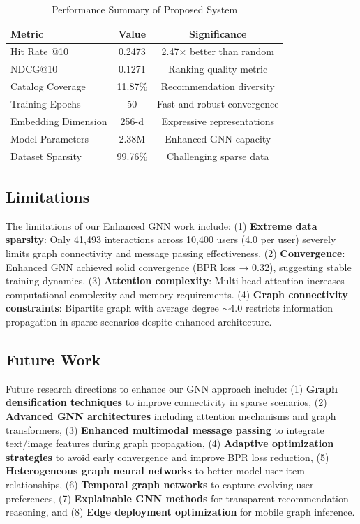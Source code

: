 \documentclass[journal]{IEEEtran} %
\begin{document}
\begin{table}[htbp]
\centering
\caption{Performance Summary of Proposed System}
\label{tab:performance_summary}
\begin{tabular}{lcc}
\toprule
\textbf{Metric} & \textbf{Value} & \textbf{Significance} \\
\midrule
Hit Rate @10 & 0.2473 & 2.47× better than random \\
NDCG@10 & 0.1271 & Ranking quality metric \\
Catalog Coverage & 11.87\% & Recommendation diversity \\
Training Epochs & 50 & Fast and robust convergence \\
Embedding Dimension & 256-d & Expressive representations \\
Model Parameters & 2.38M & Enhanced GNN capacity \\
Dataset Sparsity & 99.76\% & Challenging sparse data \\
\bottomrule
\end{tabular}
\end{table}

\FloatBarrier

\subsection{Limitations}
The limitations of our Enhanced GNN work include: (1) \textbf{Extreme data sparsity}: Only 41,493 interactions across 10,400 users (4.0 per user) severely limits graph connectivity and message passing effectiveness. (2) \textbf{Convergence}: Enhanced GNN achieved solid convergence (BPR loss → 0.32), suggesting stable training dynamics. (3) \textbf{Attention complexity}: Multi-head attention increases computational complexity and memory requirements. (4) \textbf{Graph connectivity constraints}: Bipartite graph with average degree $\sim$4.0 restricts information propagation in sparse scenarios despite enhanced architecture.

\subsection{Future Work}
Future research directions to enhance our GNN approach include: (1) \textbf{Graph densification techniques} to improve connectivity in sparse scenarios, (2) \textbf{Advanced GNN architectures} including attention mechanisms and graph transformers, (3) \textbf{Enhanced multimodal message passing} to integrate text/image features during graph propagation, (4) \textbf{Adaptive optimization strategies} to avoid early convergence and improve BPR loss reduction, (5) \textbf{Heterogeneous graph neural networks} to better model user-item relationships, (6) \textbf{Temporal graph networks} to capture evolving user preferences, (7) \textbf{Explainable GNN methods} for transparent recommendation reasoning, and (8) \textbf{Edge deployment optimization} for mobile graph inference.
\end{document}
